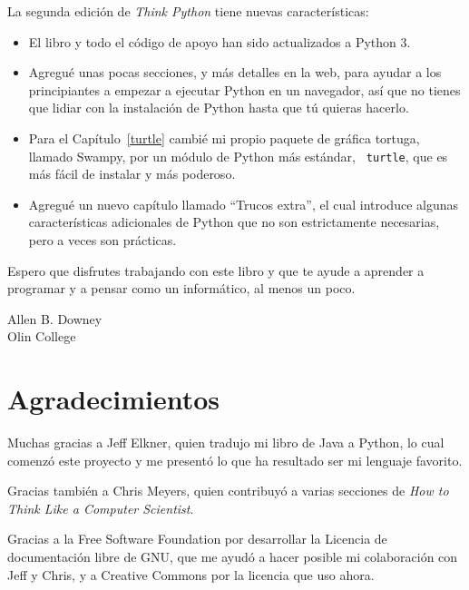 \documentclass[10pt]{book}
\begin{document}
La segunda edición de {\em Think Python} tiene nuevas características:

\begin{itemize}

\item El libro y todo el código de apoyo han sido actualizados a Python 3.

\item Agregué unas pocas secciones, y más detalles en la web, para ayudar a
los principiantes a empezar a ejecutar Python en un navegador, así que no
tienes que lidiar con la instalación de Python hasta que tú quieras hacerlo.

\item Para el Capítulo~\ref{turtle} cambié mi propio paquete de gráfica
  tortuga, llamado Swampy, por un módulo de Python más estándar, {\tt
    turtle}, que es más fácil de instalar y más poderoso.

\item Agregué un nuevo capítulo llamado ``Trucos extra'', el cual introduce
algunas características adicionales de Python que no son estrictamente
necesarias, pero a veces son prácticas.

\end{itemize}

Espero que disfrutes trabajando con este libro y que te ayude a aprender
a programar y a pensar como un informático, al menos un poco.


Allen B. Downey \\

Olin College \\


\section*{Agradecimientos}

Muchas gracias a Jeff Elkner, quien
tradujo mi libro de Java a Python, lo cual comenzó este
proyecto y me presentó lo que ha resultado ser mi
lenguaje favorito.

Gracias también a Chris Meyers, quien contribuyó a varias secciones
de {\em How to Think Like a Computer Scientist}.

Gracias a la Free Software Foundation por desarrollar
la Licencia de documentación libre de GNU, que me ayudó
a hacer posible mi colaboración con Jeff y Chris, y a Creative
Commons por la licencia que uso ahora.
\end{document}
